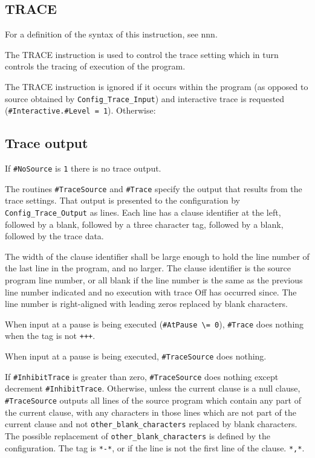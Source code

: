 \subsection{TRACE}\label{trace}

For a definition of the syntax of this instruction, see nnn.

The TRACE instruction is used to control the trace setting which in turn
controls the tracing of execution of the program.

The TRACE instruction is ignored if it occurs within the program (as
opposed to source obtained by \texttt{Config\_Trace\_Input}) and
interactive trace is requested
(\texttt{\#Interactive.\#Level\ =\ \textquotesingle{}1\textquotesingle{}}).
Otherwise:



\subsection{Trace output}\label{trace-output}

If \texttt{\#NoSource} is \texttt{\textquotesingle{}1\textquotesingle{}}
there is no trace output.

The routines \texttt{\#TraceSource} and \texttt{\#Trace} specify the
output that results from the trace settings. That output is presented to
the configuration by \texttt{Config\_Trace\_Output} as lines. Each line
has a clause identifier at the left, followed by a blank, followed by a
three character tag, followed by a blank, followed by the trace data.

The width of the clause identifier shall be large enough to hold the
line number of the last line in the program, and no larger. The clause
identifier is the source program line number, or all blank if the line
number is the same as the previous line number indicated and no
execution with trace Off has occurred since. The line number is
right-aligned with leading zeros replaced by blank characters.

When input at a pause is being executed
(\texttt{\#AtPause\ \textbackslash{}=\ 0}), \texttt{\#Trace} does
nothing when the tag is not
\texttt{\textquotesingle{}+++\textquotesingle{}}.

When input at a pause is being executed, \texttt{\#TraceSource} does
nothing.

If \texttt{\#InhibitTrace} is greater than zero, \texttt{\#TraceSource}
does nothing except decrement \texttt{\#InhibitTrace}. Otherwise, unless
the current clause is a null clause, \texttt{\#TraceSource} outputs all
lines of the source program which contain any part of the current
clause, with any characters in those lines which are not part of the
current clause and not \texttt{other\_blank\_characters} replaced by
blank characters. The possible replacement of
\texttt{other\_blank\_characters} is defined by the configuration. The
tag is \texttt{\textquotesingle{}*-*\textquotesingle{}}, or if the line
is not the first line of the clause.
\texttt{\textquotesingle{}*,*\textquotesingle{}}.

